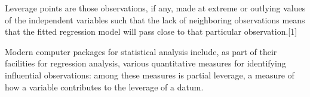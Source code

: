 \documentclass[Chap5amain.tex]{subfiles}
\begin{document}
Leverage points are those observations, if any, made at extreme or outlying values of the independent variables such that the lack of neighboring observations means that the fitted regression model will pass close to that particular observation.[1]

Modern computer packages for statistical analysis include, as part of their facilities for regression analysis, various quantitative measures for identifying influential observations: among these measures is partial leverage, a measure of how a variable contributes to the leverage of a datum.




\end{document}
